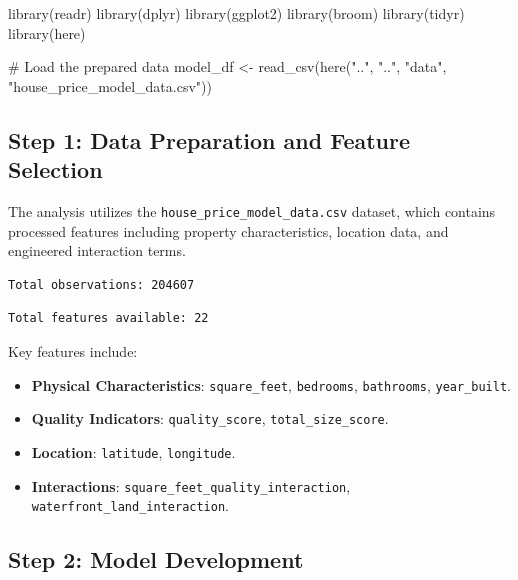 \documentclass[
  english,
  letterpaper,
  DIV=11,
  numbers=noendperiod]{scrreprt}
\newenvironment{Shaded}{\begin{snugshade}}{\end{snugshade}}
\newcommand{\CommentTok}[1]{\textcolor[rgb]{0.37,0.37,0.37}{#1}}
\newcommand{\FunctionTok}[1]{\textcolor[rgb]{0.28,0.35,0.67}{#1}}
\newcommand{\NormalTok}[1]{\textcolor[rgb]{0.00,0.23,0.31}{#1}}
\newcommand{\OtherTok}[1]{\textcolor[rgb]{0.00,0.23,0.31}{#1}}
\newcommand{\StringTok}[1]{\textcolor[rgb]{0.13,0.47,0.30}{#1}}
\providecommand{\tightlist}{%
  \setlength{\itemsep}{0pt}\setlength{\parskip}{0pt}}
\begin{document}
\begin{Shaded}
\begin{Highlighting}[]
\FunctionTok{library}\NormalTok{(readr)}
\FunctionTok{library}\NormalTok{(dplyr)}
\FunctionTok{library}\NormalTok{(ggplot2)}
\FunctionTok{library}\NormalTok{(broom)}
\FunctionTok{library}\NormalTok{(tidyr)}
\FunctionTok{library}\NormalTok{(here)}

\CommentTok{\# Load the prepared data}
\NormalTok{model\_df }\OtherTok{\textless{}{-}} \FunctionTok{read\_csv}\NormalTok{(}\FunctionTok{here}\NormalTok{(}\StringTok{".."}\NormalTok{, }\StringTok{".."}\NormalTok{, }\StringTok{"data"}\NormalTok{, }\StringTok{"house\_price\_model\_data.csv"}\NormalTok{))}
\end{Highlighting}
\end{Shaded}

\subsection{Step 1: Data Preparation and Feature
Selection}\label{step-1-data-preparation-and-feature-selection}

The analysis utilizes the \texttt{house\_price\_model\_data.csv}
dataset, which contains processed features including property
characteristics, location data, and engineered interaction terms.

\begin{verbatim}
Total observations: 204607 
\end{verbatim}

\begin{verbatim}
Total features available: 22 
\end{verbatim}

Key features include:

\begin{itemize}
\tightlist
\item
  \textbf{Physical Characteristics}: \texttt{square\_feet},
  \texttt{bedrooms}, \texttt{bathrooms}, \texttt{year\_built}.
\item
  \textbf{Quality Indicators}: \texttt{quality\_score},
  \texttt{total\_size\_score}.
\item
  \textbf{Location}: \texttt{latitude}, \texttt{longitude}.
\item
  \textbf{Interactions}: \texttt{square\_feet\_quality\_interaction},
  \texttt{waterfront\_land\_interaction}.
\end{itemize}

\subsection{Step 2: Model Development}\label{step-2-model-development}
\end{document}

